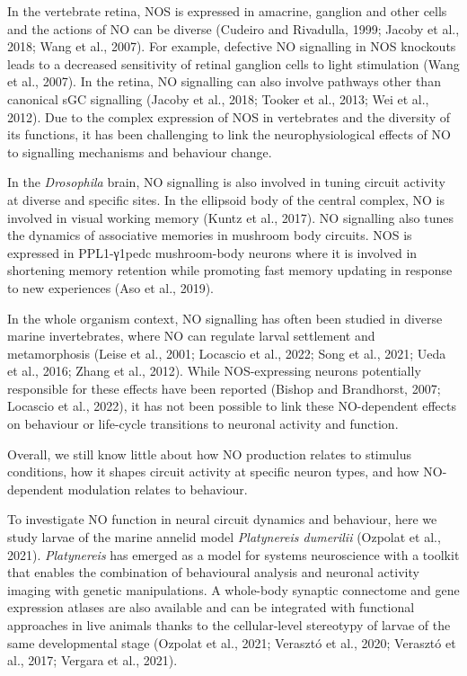 \documentclass[
  10pt,
  onecolumn]{article}
\begin{document}
In the vertebrate retina, NOS is expressed in amacrine, ganglion and
other cells and the actions of NO can be diverse (Cudeiro and Rivadulla,
1999; Jacoby et al., 2018; Wang et al., 2007). For example, defective NO
signalling in NOS knockouts leads to a decreased sensitivity of retinal
ganglion cells to light stimulation (Wang et al., 2007). In the retina,
NO signalling can also involve pathways other than canonical sGC
signalling (Jacoby et al., 2018; Tooker et al., 2013; Wei et al., 2012).
Due to the complex expression of NOS in vertebrates and the diversity of
its functions, it has been challenging to link the neurophysiological
effects of NO to signalling mechanisms and behaviour change.

In the \emph{Drosophila} brain, NO signalling is also involved in tuning
circuit activity at diverse and specific sites. In the ellipsoid body of
the central complex, NO is involved in visual working memory (Kuntz et
al., 2017). NO signalling also tunes the dynamics of associative
memories in mushroom body circuits. NOS is expressed in PPL1-γ1pedc
mushroom-body neurons where it is involved in shortening memory
retention while promoting fast memory updating in response to new
experiences (Aso et al., 2019).

In the whole organism context, NO signalling has often been studied in
diverse marine invertebrates, where NO can regulate larval settlement
and metamorphosis (Leise et al., 2001; Locascio et al., 2022; Song et
al., 2021; Ueda et al., 2016; Zhang et al., 2012). While NOS-expressing
neurons potentially responsible for these effects have been reported
(Bishop and Brandhorst, 2007; Locascio et al., 2022), it has not been
possible to link these NO-dependent effects on behaviour or life-cycle
transitions to neuronal activity and function.

Overall, we still know little about how NO production relates to
stimulus conditions, how it shapes circuit activity at specific neuron
types, and how NO-dependent modulation relates to behaviour.

To investigate NO function in neural circuit dynamics and behaviour,
here we study larvae of the marine annelid model \emph{Platynereis
dumerilii} (Ozpolat et al., 2021). \emph{Platynereis} has emerged as a
model for systems neuroscience with a toolkit that enables the
combination of behavioural analysis and neuronal activity imaging with
genetic manipulations. A whole-body synaptic connectome and gene
expression atlases are also available and can be integrated with
functional approaches in live animals thanks to the cellular-level
stereotypy of larvae of the same developmental stage (Ozpolat et al.,
2021; Verasztó et al., 2020; Verasztó et al., 2017; Vergara et al.,
2021).
\end{document}
